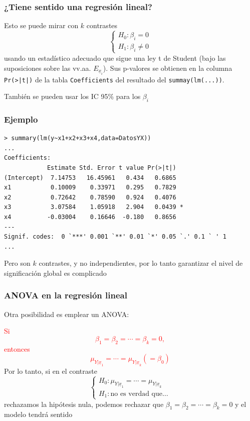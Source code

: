 \documentclass[12pt,t]{beamer}
\newcommand{\red}[1]{\textcolor{red}{#1}}
\theoremstyle{plain}
\theoremstyle{definition}
\begin{document}
\begin{frame}
\frametitle{¿Tiene sentido una regresión lineal?}

Esto se puede mirar con $k$ contrastes
$$
\left\{\begin{array}{l} H_0: \beta_i=0 \\
H_1: \beta_i
\neq 0 \end{array}
\right.
$$
usando un estadístico adecuado que sigue una ley t de Student (bajo las suposiciones sobre las vv.aa. $E_{\underline{x}_i}$).
Sus p-valores se obtienen en la columna \texttt{Pr(>|t|)} de la tabla \texttt{Coefficients}
del resultado del \texttt{summay(lm(...))}.\medskip

También se pueden usar los IC 95\% para los $\beta_i$
\end{frame}




\begin{frame}[fragile]
\frametitle{Ejemplo}

\begin{lstlisting}[style=petit]
> summary(lm(y~x1+x2+x3+x4,data=DatosYX))
...
Coefficients:
            Estimate Std. Error t value Pr(>|t|)  
(Intercept)  7.14753   16.45961   0.434   0.6865  
x1           0.10009    0.33971   0.295   0.7829  
x2           0.72642    0.78590   0.924   0.4076  
x3           3.07584    1.05918   2.904   0.0439 *
x4          -0.03004    0.16646  -0.180   0.8656  
---
Signif. codes:  0 `***' 0.001 `**' 0.01 `*' 0.05 `.' 0.1 ` ' 1
...
\end{lstlisting}

Pero son $k$ contrastes, y no independientes, por lo tanto garantizar el nivel de significación global es complicado
\end{frame}




\begin{frame}
\frametitle{ANOVA en la regresión lineal}

Otra posibilidad es emplear un ANOVA:
\medskip

\red{Si $$\beta_1=\beta_2=\cdots=\beta_k=0,$$ entonces $$\mu_{Y|\underline{x}_1}=\cdots=\mu_{Y|\underline{x}_k}(=\beta_0)$$}
Por lo tanto, si en el contraste
$$
\left\{\begin{array}{l}
H_0:\mu_{Y|\underline{x}_1}=\cdots=\mu_{Y|\underline{x}_k}\\
H_1:\mbox{no es verdad que\ldots}
\end{array}
\right.
$$
rechazamos la hipótesis nula, podemos rechazar que $\beta_1=\beta_2=\cdots=\beta_k=0$
y el modelo tendrá sentido
\end{frame}
\end{document}

